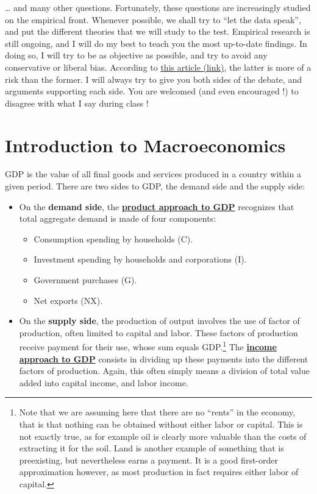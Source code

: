 \documentclass[]{book}
\providecommand{\tightlist}{%
  \setlength{\itemsep}{0pt}\setlength{\parskip}{0pt}}
\let\rmarkdownfootnote\footnote%
\def\footnote{\protect\rmarkdownfootnote}
\theoremstyle{definition}
\theoremstyle{definition}
\theoremstyle{definition}
\theoremstyle{remark}
\begin{document}
\ldots{} and many other questions. Fortunately, these questions are
increasingly studied on the empirical front. Whenever possible, we shall
try to ``let the data speak'', and put the different theories that we
will study to the test. Empirical research is still ongoing, and I will
do my best to teach you the most up-to-date findings. In doing so, I
will try to be as objective as possible, and try to avoid any
conservative or liberal bias. According to
\href{https://www.bloomberg.com/view/articles/2018-09-17/colleges-have-way-too-many-liberal-professors}{this
article (link)}, the latter is more of a risk than the former. I will
always try to give you both sides of the debate, and arguments
supporting each side. You are welcomed (and even encouraged !) to
disagree with what I say during class !

\hypertarget{intro-cobb}{\chapter{Introduction to
Macroeconomics}\label{intro-cobb}}

GDP is the value of all final goods and services produced in a country
within a given period. There are two sides to GDP, the demand side and
the supply side:

\begin{itemize}
\tightlist
\item
  On the \textbf{demand side}, the
  \protect\hyperlink{gdp-product}{\textbf{product approach to GDP}}
  recognizes that total aggregate demand is made of four components:

  \begin{itemize}
  \tightlist
  \item
    Consumption spending by households (C).
  \item
    Investment spending by households and corporations (I).
  \item
    Government purchases (G).
  \item
    Net exports (NX).
  \end{itemize}
\item
  On the \textbf{supply side}, the production of output involves the use
  of factor of production, often limited to capital and labor. These
  factors of production receive payment for their use, whose sum equals
  GDP.\footnote{Note that we are assuming here that there are no
    ``rents'' in the economy, that is that nothing can be obtained
    without either labor or capital. This is not exactly true, as for
    example oil is clearly more valuable than the costs of extracting it
    for the soil. Land is another example of something that is
    preexisting, but nevertheless earns a payment. It is a good
    first-order approximation however, as most production in fact
    requires either labor of capital.} The
  \protect\hyperlink{gdp-income}{\textbf{income approach to GDP}}
  consists in dividing up these payments into the different factors of
  production. Again, this often simply means a division of total value
  added into capital income, and labor income.
\end{itemize}
\end{document}
